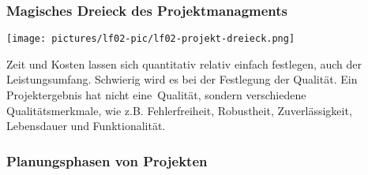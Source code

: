 \subsubsection{Magisches Dreieck des Projektmanagments}

\texttt{[image: pictures/lf02-pic/lf02-projekt-dreieck.png]}

Zeit und Kosten lassen sich quantitativ relativ einfach festlegen, auch der Leistungsumfang. Schwierig wird es bei der Festlegung der Qualität. Ein Projektergebnis hat nicht \ql eine\qr\ Qualität, sondern verschiedene Qualitätsmerkmale, wie z.B. Fehlerfreiheit, Robustheit, Zuverlässigkeit, Lebensdauer und Funktionalität.

\subsubsection{Planungsphasen von Projekten}

